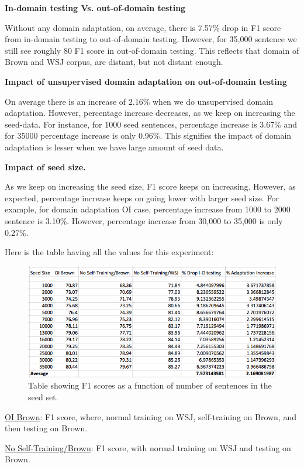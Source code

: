 \textbf {In-domain testing Vs. out-of-domain testing}

Without any domain adaptation, on average, there is 7.57\% drop in F1 score from in-domain testing to out-of-domain testing. However, for 35,000 sentence we still see roughly 80 F1 score in out-of-domain testing. This reflects that domain of Brown and WSJ corpus, are distant, but not distant enough.

\textbf {Impact of unsupervised domain adaptation on out-of-domain testing}

On average there is an increase of 2.16\% when we do unsupervised domain adaptation. However, percentage increase decreases, as we keep on increasing the seed-data. For instance, for 1000 seed sentences, percentage increase is 3.67\% and for 35000 percentage increase is only 0.96\%. This signifies the impact of domain adaptation is lesser when we have large amount of seed data.

\textbf {Impact of seed size.}

As we keep on increasing the seed size, F1 score keeps on increasing. However, as expected, percentage increase keeps on going lower with larger seed size. For example, for domain adaptation OI case, percentage increase from 1000 to 2000 sentence is 3.10\%. However, percentage increase from 30,000 to 35,000 is only 0.27\%. 

Here is the table having all the values for this experiment:

\begin{figure}[ht!]
\centering
\includegraphics[width=140mm]{exp1-snapshot.png}
\caption{Table showing F1 scores as a function of number of sentences in the seed set. }
\label{accuracy}
\end{figure}


\underline{OI Brown}: F1 score, where, normal training on WSJ, self-training on Brown, and then testing on Brown.

\underline{No Self-Training/Brown}: F1 score, with normal training on WSJ and testing on Brown. 

